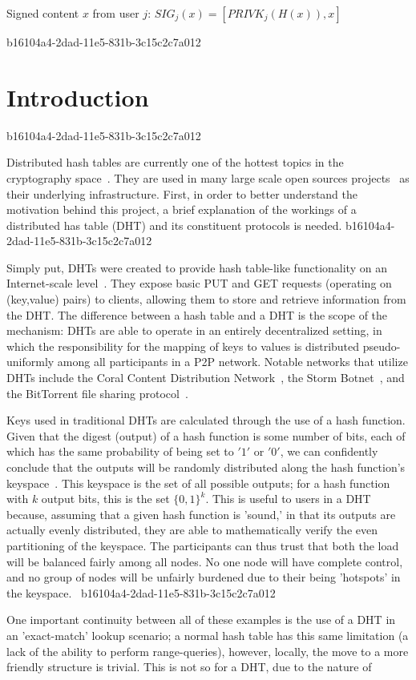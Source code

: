 \documentclass[12pt]{article}
\begin{document}
Signed content $x$ from user $j$: $SIG_j(x) = \left[ PRIVK_j( H(x) ), x \right]$

b16104a4-2dad-11e5-831b-3c15c2c7a012\section{Introduction}
b16104a4-2dad-11e5-831b-3c15c2c7a012\par Distributed hash tables are currently one of the hottest topics in the cryptography space~\cite{Stoica:2001dj,Rowstron:2001ea,Ratnasamy:2001wn}. They are used in many large scale open sources projects~\cite{Freitas:2013tb,Xu:2010vs,Perfitt:2010fh} as their underlying infrastructure. First, in order to better understand the motivation behind this project, a brief explanation of the workings of a distributed has table (DHT) and its constituent protocols is needed.
b16104a4-2dad-11e5-831b-3c15c2c7a012
\par Simply put, DHTs were created to provide hash table-like functionality on an Internet-scale level~\cite{Ratnasamy:2001wn}. They expose basic PUT and GET requests (operating on (key,value) pairs) to clients, allowing them to store and retrieve information from the DHT. The difference between a hash table and a DHT is the scope of the mechanism: DHTs are able to operate in an entirely decentralized setting, in which the responsibility for the mapping of keys to values is distributed pseudo-uniformly among all participants in a P2P network. Notable networks that utilize DHTs include the Coral Content Distribution Network~\cite{Freedman:2004vb}, the Storm Botnet~\cite{Holz:2008uk}, and the BitTorrent file sharing protocol~\cite{Cohen:y1_8mBnw}.

\par Keys used in traditional DHTs are calculated through the use of a hash function. Given that the digest (output) of a hash function is some number of bits, each of which has the same probability of being set to $'1'$ or $'0'$, we can confidently conclude that the outputs will be randomly distributed along the hash function's keyspace~. This keyspace is the set of all possible outputs; for a hash function with $k$ output bits, this is the set $\{0,1\}^k$. This is useful to users in a DHT because, assuming that a given hash function is 'sound,' in that its outputs are actually evenly distributed, they are able to mathematically verify the even partitioning of the keyspace. The participants can thus trust that both the load will be balanced fairly among all nodes. No one node will have complete control, and no group of nodes will be unfairly burdened due to their being 'hotspots' in the keyspace.~
b16104a4-2dad-11e5-831b-3c15c2c7a012
\par One important continuity between all of these examples is the use of a DHT in an 'exact-match' lookup scenario; a normal hash table has this same limitation (a lack of the ability to perform range-queries), however, locally, the move to a more friendly structure is trivial. This is not so for a DHT, due to the nature of
\printbibliography
\end{document}
